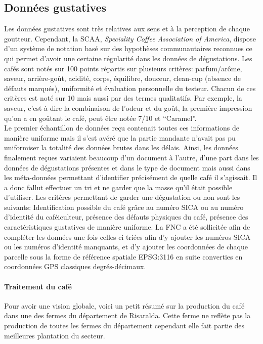 \subsection{Données gustatives}
Les données gustatives sont très relatives aux sens et à la perception de chaque goutteur. Cependant, la SCAA, \textit{Speciality Coffee Association of America}, dispose d’un système de notation basé sur des hypothèses communautaires reconnues ce qui permet d’avoir une certaine régularité dans les données de dégustations. Les cafés sont notés sur 100 points répartis sur plusieurs critères: parfum/arôme, saveur, arrière-goût, acidité, corps, équilibre, douceur, clean-cup (absence de défauts marqués), uniformité et évaluation personnelle du testeur.  Chacun de ces critères est noté sur 10 mais aussi par des termes qualitatifs. Par exemple, la saveur, c’est-à-dire la combinaison de l’odeur et du goût, la première impression qu’on a en goûtant le café, peut être notée 7/10 et “Caramel”. \\

\noindent Le premier échantillon de données reçu contenait toutes ces informations de manière uniforme mais il s'est avéré que la partie mandante n'avait pas pu uniformiser la totalité des données brutes dans les délais. Ainsi, les données finalement reçues variaient beaucoup d'un document à l'autre, d'une part dans les données de dégustations présentes et dans le type de document mais aussi dans les méta-données permettant d'identifier précisément de quelle café il s'agissait. Il a donc fallut effectuer un tri et ne garder que la masse qu'il était possible d'utiliser. Les critères permettant de garder une dégustation ou non sont les suivants: Identification possible du café grâce au numéro SICA ou au numéro d'identité du caféiculteur, présence des défauts physiques du café, présence des caractéristiques gustatives de manière uniforme. La FNC a été sollicitée afin de compléter les données une fois celles-ci triées afin d'y ajouter les numéros SICA ou les numéros d'identité manquants, et d'y ajouter les coordonnées de chaque parcelle sous la forme de référence spatiale EPSG:3116 en suite converties en coordonnées GPS classiques degrés-décimaux.\\

\paragraph{Traitement du café} Pour avoir une vision globale, voici un petit résumé sur la production du café dans une des fermes du département de Risaralda. Cette ferme ne reflète pas la production de toutes les fermes du département cependant elle fait partie des meilleures plantation du secteur. \\

